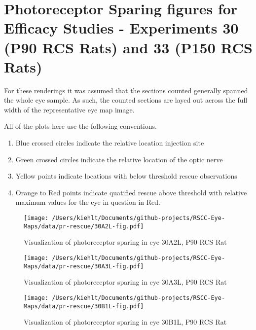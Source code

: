 \documentclass{article}
\begin{document}
\clearpage




\section{Photoreceptor Sparing figures for Efficacy Studies - Experiments 30 (P90 RCS Rats) and 33 (P150 RCS Rats)}
For these renderings it was assumed that the sections counted generally spanned the whole eye sample. As such, the counted sections are layed out across the full width of the representative eye map image.

All of the plots here use the following conventions. 
\begin{enumerate}
\item Blue crossed circles indicate the relative location injection site
\item Green crossed circles indicate the relative location of the optic nerve
\item Yellow points indicate locations with below threshold rescue observations
\item Orange to Red points indicate quatified rescue above threshold with relative maximum values for the eye in question in Red.
\end{enumerate}
\begin{center}
\begin{figure}
\texttt{[image: /Users/kiehlt/Documents/github-projects/RSCC-Eye-Maps/data/pr-rescue/30A2L-fig.pdf]}
\caption{Visualization of photoreceptor sparing in eye 30A2L, P90 RCS Rat}
\label{fig:30A2L}
\end{figure}

\end{center}
\begin{center}
\begin{figure}
\texttt{[image: /Users/kiehlt/Documents/github-projects/RSCC-Eye-Maps/data/pr-rescue/30A3L-fig.pdf]}
\caption{Visualization of photoreceptor sparing in eye 30A3L, P90 RCS Rat}
\label{fig:30A3L}
\end{figure}

\end{center}
\begin{center}
\begin{figure}
\texttt{[image: /Users/kiehlt/Documents/github-projects/RSCC-Eye-Maps/data/pr-rescue/30B1L-fig.pdf]}
\caption{Visualization of photoreceptor sparing in eye 30B1L, P90 RCS Rat}
\label{fig:30B1L}
\end{figure}

\end{center}
\end{document}
